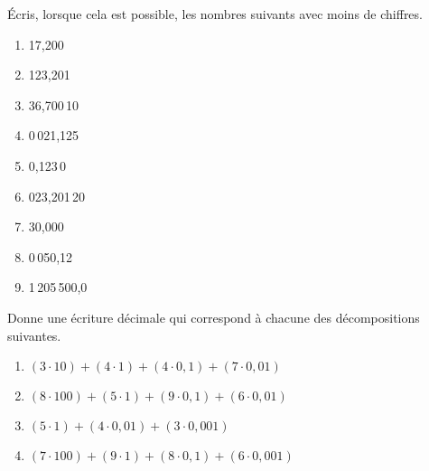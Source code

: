 \begin{exercice}
Écris, lorsque cela est possible, les nombres suivants avec moins de chiffres.
\begin{enumerate} 
 \item 17,200 \dotfill \hspace*{13em}
 
 \item 123,201 \dotfill \hspace*{13em}
 
 \item 36,700\,10 \dotfill \hspace*{13em}
 
 \item 0\,021,125 \dotfill \hspace*{13em}
 
 \item 0,123\,0 \dotfill \hspace*{13em}
 
 \item 023,201\,20 \dotfill \hspace*{13em}
 
 \item 30,000 \dotfill \hspace*{13em}
 
 \item 0\,050,12 \dotfill \hspace*{13em}
 
 \item 1\,205\,500,0 \dotfill \hspace*{13em}
 
 \end{enumerate}
\end{exercice}


\begin{exercice}[Décomposition]
Donne une écriture décimale qui correspond à chacune des décompositions suivantes.
\begin{enumerate}
 \item $(3 \cdot 10) + (4 \cdot 1) + (4 \cdot 0,1) + (7 \cdot 0,01)$
 \item $(8 \cdot 100) + (5 \cdot 1) + (9 \cdot 0,1) + (6 \cdot 0,01)$
 \item $(5 \cdot 1) + (4 \cdot 0,01) + (3 \cdot 0,001)$
 \item $(7 \cdot 100) + (9 \cdot 1) + (8 \cdot 0,1) + (6 \cdot 0,001)$
 \end{enumerate}
\end{exercice}


